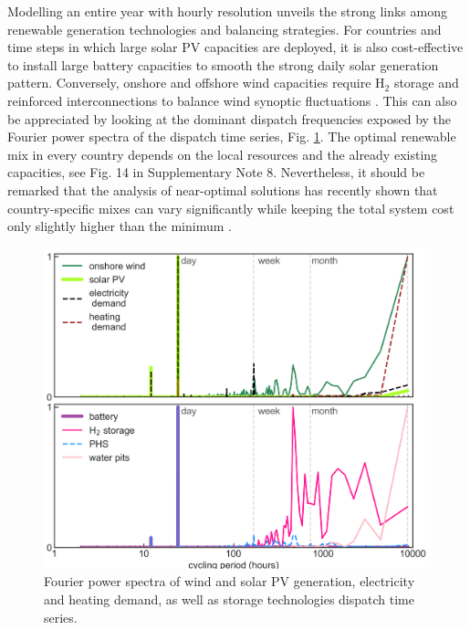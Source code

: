\documentclass[5p]{elsarticle} %
\begin{document}
Modelling an entire year with hourly resolution unveils the strong links among renewable generation technologies and balancing strategies. For countries and time steps in which large solar PV capacities are deployed, it is also cost-effective to install large battery capacities to smooth the strong daily solar generation pattern. Conversely, onshore and offshore wind capacities require H$_2$ storage and reinforced interconnections to balance wind synoptic fluctuations \cite{Rasmussen_2012, Rodriguez_2014, Schlachtberger_2017, Victoria_2019_storage}. This can also be appreciated by looking at the dominant dispatch frequencies exposed by the Fourier power spectra of the dispatch time series, Fig. \ref{fig_Fourier}. The optimal renewable mix in every country depends on the local resources and the already existing capacities, see Fig. 14 in Supplementary Note 8. Nevertheless, it should be remarked that the analysis of near-optimal solutions has recently shown that country-specific mixes can vary significantly while keeping the total system cost only slightly higher than the minimum \cite{Neumann_2019}. 

\begin{figure}[!h]
\centering
\includegraphics[width=\columnwidth]{figures/Fourier.png}
\caption{Fourier power spectra of wind and solar PV generation, electricity and heating demand, as well as storage technologies dispatch time series.} \label{fig_Fourier} 
\end{figure}

\FloatBarrier
 
\end{document}
